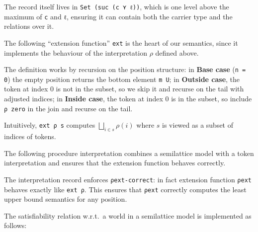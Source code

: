 \documentclass{article}
\theoremstyle{definition}
\begin{document}
{{The record itself lives in \texttt{Set (suc (c ⋎ ℓ))}, which is one level above the maximum of \texttt{c} and \texttt{ℓ}, ensuring it can contain both the carrier type and the relations over it.


\bigskip

The following ``extension function'' \texttt{ext} is the heart of our semantics, since it implements the behaviour of the interpretation $\rho$ defined above.%


The definition works by recursion on the position structure:
in \textbf{Base case} (\texttt{n = 0}) the empty position returns the bottom element \texttt{m U}; in \textbf{Outside case}, the token at index 0 is not in the subset, so we skip it and recurse on the tail with adjusted indices; in \textbf{Inside case}, the token at index 0 is in the subset, so include \texttt{ρ zero} in the join and recurse on the tail.

Intuitively, \texttt{ext ρ s} computes $\bigsqcup_{i \in s} \rho(i)$ where $s$ is viewed as a subset of indices of tokens.

The following procedure %
interpretation combines a semilattice model with a token interpretation and ensures that the extension function behaves correctly.


The interpretation record enforces \texttt{ρext-correct}: in fact extension function \texttt{ρext} behaves exactly like \texttt{ext ρ}. 
This ensures that \texttt{ρext} correctly computes the least upper bound semantics for any position.

The satisfiability relation w.r.t.\ a world in a semilattice model is implemented as follows:


}}
\end{document}

